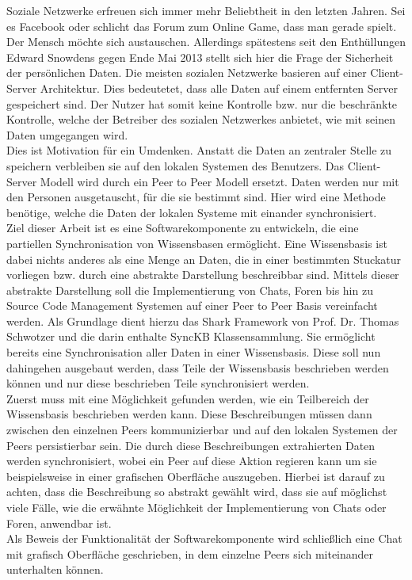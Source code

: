 \documentclass[a4paper]{article}
\begin{document}
	Soziale Netzwerke erfreuen sich immer mehr Beliebtheit in den letzten Jahren. 
	Sei es Facebook oder schlicht das Forum zum Online Game, dass man gerade
	spielt. Der Mensch möchte sich austauschen. Allerdings spätestens seit den
	Enthüllungen Edward Snowdens gegen Ende Mai 2013 stellt sich hier die Frage
	der Sicherheit der persönlichen Daten. Die meisten sozialen Netzwerke basieren
	auf einer Client-Server Architektur. Dies bedeutetet, dass alle Daten auf einem
	entfernten Server gespeichert sind. Der Nutzer hat somit keine Kontrolle bzw.
	nur die beschränkte Kontrolle, welche der Betreiber des sozialen Netzwerkes
	anbietet, wie mit seinen Daten umgegangen wird. \\
	
	Dies ist Motivation für ein Umdenken. Anstatt die Daten an zentraler Stelle
	zu speichern verbleiben sie auf den lokalen Systemen des Benutzers. Das
	Client-Server Modell wird durch ein Peer to Peer Modell ersetzt. Daten
	werden nur mit den Personen ausgetauscht, für die sie bestimmt sind.
	Hier wird eine Methode benötige, welche die Daten der lokalen Systeme
	mit einander synchronisiert. \\

	Ziel dieser Arbeit ist es eine Softwarekomponente zu entwickeln, die eine 
	partiellen Synchronisation von Wissensbasen ermöglicht. Eine Wissensbasis
	ist dabei nichts anderes als eine Menge an Daten, die in einer
	bestimmten Stuckatur vorliegen bzw. durch eine abstrakte Darstellung
	beschreibbar sind. Mittels dieser abstrakte Darstellung soll die 
	Implementierung von Chats, Foren bis hin zu Source Code Management Systemen
	auf einer Peer to Peer Basis vereinfacht werden.
	Als Grundlage dient hierzu das Shark Framework \cite{SharkFW} von Prof.
	Dr.	Thomas Schwotzer und die darin enthalte SyncKB Klassensammlung. Sie
	ermöglicht bereits eine Synchronisation aller Daten in einer Wissensbasis.
	Diese soll nun dahingehen ausgebaut werden, dass Teile der Wissensbasis
	beschrieben werden können und nur diese beschrieben Teile synchronisiert 
	werden. \\
	
	Zuerst muss mit eine Möglichkeit gefunden werden, wie ein Teilbereich der
	Wissensbasis beschrieben werden kann. Diese Beschreibungen müssen dann
	zwischen den einzelnen Peers kommunizierbar und auf den lokalen Systemen der
	Peers persistierbar sein. Die durch diese Beschreibungen extrahierten Daten
	werden synchronisiert, wobei ein Peer auf diese Aktion regieren kann um
	sie beispielsweise in einer grafischen Oberfläche auszugeben. Hierbei
	ist darauf zu achten, dass die Beschreibung so abstrakt gewählt wird, dass 
	sie	auf möglichst viele Fälle, wie die erwähnte Möglichkeit der 
	Implementierung von Chats oder Foren, anwendbar ist. \\
	Als Beweis der Funktionalität der Softwarekomponente wird schließlich
	eine Chat mit grafisch Oberfläche geschrieben, in dem einzelne Peers sich
	miteinander	unterhalten können.\\
	
\end{document}
